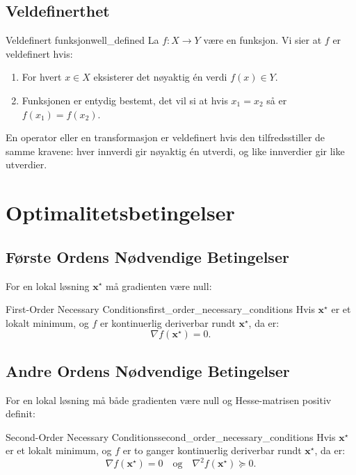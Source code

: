 


\section{Veldefinerthet}
\begin{definition}{Veldefinert funksjon}{well_defined}
    La $f: X \to Y$ være en funksjon. Vi sier at $f$ er veldefinert hvis:
    \begin{enumerate}
        \item For hvert $x \in X$ eksisterer det nøyaktig én verdi $f(x) \in Y$.
        \item Funksjonen er entydig bestemt, det vil si at hvis $x_1 = x_2$ så er $f(x_1) = f(x_2)$.
    \end{enumerate}
    
    En operator eller en transformasjon er veldefinert hvis den tilfredsstiller de samme kravene: hver innverdi gir nøyaktig én utverdi, og like innverdier gir like utverdier.
\end{definition}

\chapter{Optimalitetsbetingelser}
\label{chap:optimality_conditions}
\section{Første Ordens Nødvendige Betingelser}

For en lokal løsning \(\mathbf{x}^\star\) må gradienten være null:

\begin{theorem}{First-Order Necessary Conditions}{first_order_necessary_conditions}
	Hvis \(\mathbf{x}^\star\) er et lokalt minimum, og \(f\) er kontinuerlig deriverbar rundt \(\mathbf{x}^\star\), da er:
	\[
		\nabla f(\mathbf{x}^\star) = 0.
	\]
\end{theorem}

\section{Andre Ordens Nødvendige Betingelser}

For en lokal løsning må både gradienten være null og Hesse-matrisen positiv definit:

\begin{theorem}{Second-Order Necessary Conditions}{second_order_necessary_conditions}
	Hvis \(\mathbf{x}^\star\) er et lokalt minimum, og \(f\) er to ganger kontinuerlig deriverbar rundt \(\mathbf{x}^\star\), da er:
	\[
		\nabla f(\mathbf{x}^\star) = 0 \quad \text{og} \quad \nabla^2 f(\mathbf{x}^\star) \succeq 0.
	\]
\end{theorem}


